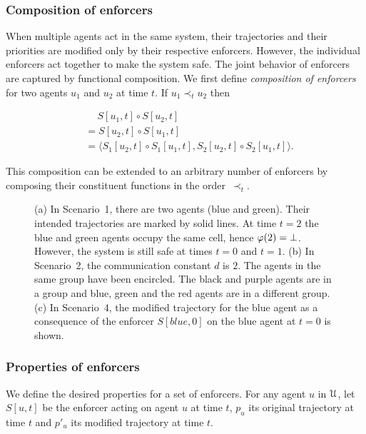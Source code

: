 \subsubsection*{Composition of enforcers}

When multiple agents act in the same system, their trajectories and their priorities are modified only by their respective enforcers. However, the individual enforcers act together to make the system safe. The joint behavior of enforcers are captured by functional composition.  We first define \emph{composition of enforcers} for two agents $u_1$ and $u_2$ at time $t$. If $u_1 \prec_t u_2$ then

\begin{align}
    &\quad~S[u_1,t] \circ S[u_2,t] \nonumber \\ 
    &= S[u_2,t] \circ S[u_1,t] \\
    &=\langle S_1[u_2,t] \circ S_1[u_1,t], S_2[u_2,t] \circ S_2[u_1,t]\rangle. %
\end{align}

This composition can be extended to an arbitrary number of enforcers by composing their constituent functions in the order~$\prec_t$.

\begin{figure*}[tbh]
\centering
{}
\caption[Examples of unsafe behavior, real-time  communication groups, and resulting safe behavior.]{(a) In Scenario~1, there are two agents (blue and green). Their intended trajectories are marked by solid lines. At time $t=2$ the blue and green agents occupy the same cell, hence $\varphi(2) = \bot$. However, the system is still safe at times $t=0$ and $t=1$.
(b) In Scenario~2, the communication constant $d$ is $2$. The agents in the same group have been encircled. The black and purple agents are in a group and blue, green and the red agents are in a different group. (c)  In Scenario~4, the modified trajectory for the blue agent as a consequence of the enforcer $S[blue,0]$ on the blue agent at $t=0$ is shown.}
\label{fig:eg7}
\end{figure*}

\subsubsection*{Properties of enforcers}
We define the desired properties for a set of enforcers. 
For any agent $u$ in $\mathcal{U}$, let $S[u,t]$ be the enforcer acting on agent $u$ at time $t$, $p_u$ its original trajectory at time $t$ and $p'_u$ its modified trajectory at time $t$.  

